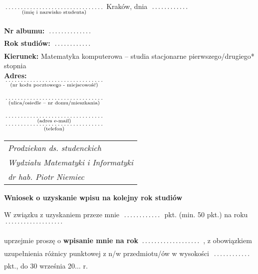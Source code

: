 \documentclass[a4paper,11pt]{article}
\newcommand{\fillField}[2]{
    $\underset{\text{#1}}{\parbox[t]{#2}{\dotfill}}$
}
\begin{document}
\noindent
\fillField{(imię i nazwisko studenta)}{5cm} \hfill Kraków, dnia \fillField{}{2cm} \\\\
\textbf{Nr albumu:}   \fillField{}{2.3cm}\\
\textbf{Rok studiów:} \fillField{}{2cm}\\
\textbf{Kierunek:} Matematyka komputerowa -- studia stacjonarne pierwszego/drugiego* stopnia\\
\textbf{Adres:}\\
\fillField{(nr kodu pocztowego - miejscowość)}{5cm}\\\\
\fillField{(ulica/osiedle – nr domu/mieszkania)}{5cm}\\\\
\fillField{(adres e-mail)}{5cm}\\
\fillField{(telefon)}{5cm}
\phantom{a}\hfill
\begin{tabular}[c]{@{}l@{}}
\textit{Prodziekan ds. studenckich} \\
\textit{Wydziału Matematyki i Informatyki}\\
\textit{dr hab. Piotr Niemiec}
\end{tabular}

\vskip 1.0cm

\begin{center}
{\Large \textbf{Wniosek o uzyskanie wpisu na kolejny rok studiów}}
\end{center}

\vskip 0.5cm

\noindent
W związku z uzyskaniem przeze mnie \fillField{}{2cm} pkt. (min. 50 pkt.) na roku \fillField{}{3cm}
uprzejmie proszę o \textbf{wpisanie mnie na rok} \fillField{}{3cm}, z obowiązkiem uzupełnienia różnicy punktowej z n/w przedmiotu/ów
 w wysokości \fillField{}{2cm} pkt., do 30 września 20$\ldots$ r.
\end{document}
